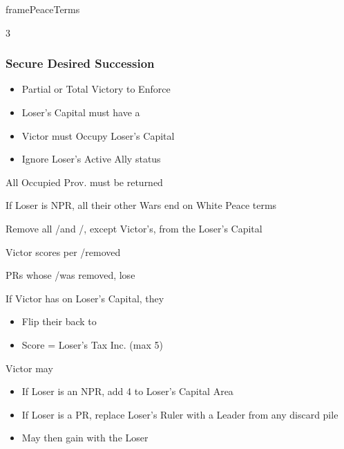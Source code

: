 \documentclass[10pt]{article}
\newlength{\fhPeaceTerms} \setlength\fhPeaceTerms{45.5\baselineskip}
\begin{document}
\begin{dynamiccontents*}{framePeaceTerms}
\begin{eubox}{\fhPeaceTerms}
\begin{multicols}{3}
		\subsubsection*{Secure Desired Succession }
		\begin{itemize}
			{
				\color{peaceReqColor}
				\item {}
				\begin{itemize}
					\item Partial or Total Victory to Enforce
					\item Loser's Capital must have a \disputedsuccession
					\item Victor must Occupy Loser's Capital
					\item Ignore Loser's Active Ally status
				\end{itemize}
			}
			\item All Occupied Prov. must be returned
			\item If Loser is NPR, all their other Wars end on White Peace terms
			\item Remove all \marriage/\disputedsuccession and \alliance/\activeally, except Victor's, from the Loser's Capital
			\item Victor scores  per \marriage/\disputedsuccession removed
			\item PRs whose \marriage/\disputedsuccession was removed, lose 
			\item If Victor has \disputedsuccession on Loser's Capital, they
			\begin{itemize}
				\item Flip their \disputedsuccession back to \marriage
				\item Score \prestige = Loser's Tax Inc. (max 5)
			\end{itemize}
			\item Victor may
			\begin{itemize}
				\item If Loser is an NPR, add 4 \influence to Loser's Capital Area
				\item If Loser is a PR, replace Loser's Ruler with a Leader from any discard pile
				\item May then gain \alliance with the Loser
			\end{itemize}
		\end{itemize}


\end{multicols}
\end{eubox}
\end{dynamiccontents*}
\end{document}
